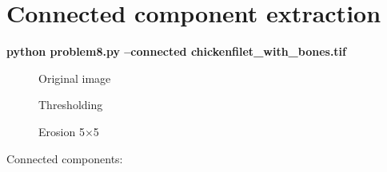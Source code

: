 \pagebreak

\section{Connected component extraction}

\textbf{python problem8.py --connected chickenfilet\_with\_bones.tif}

\begin{figure}[!htb]\centering
    \begin{minipage}{0.45\textwidth}
        \caption{\small{Original image}}
    \end{minipage}
    \begin{minipage}{0.45\textwidth}
        \caption{\small{Thresholding}}\label{diagram:connected_threshold}
    \end{minipage}
\end{figure}

\begin{figure}[!htb]\centering
    \begin{minipage}{0.60\textwidth}
        \caption{\small{Erosion 5$\times$5}}\label{diagram:connected_erosion}
    \end{minipage}
\end{figure}
\bigskip
Connected components:

